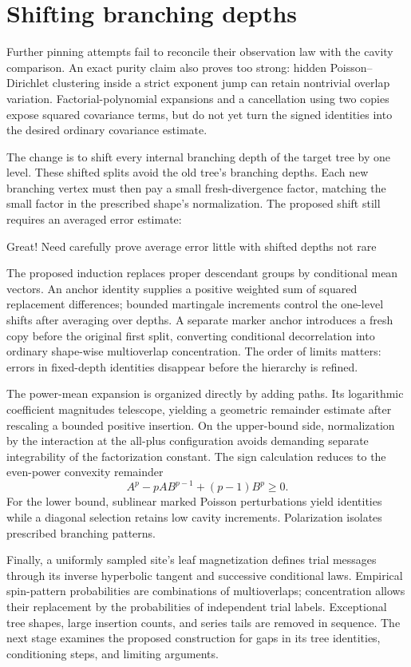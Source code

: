 \documentclass[11pt,letterpaper]{article}
\newcommand{\QuoteSource}[1]{\par\Needspace{4\baselineskip}\smallskip\noindent{\footnotesize\sffamily\color{accent}VERBATIM EXCERPT}\par\nobreak}
\begin{document}
\section{Shifting branching depths}
Further pinning attempts fail to reconcile their observation law with the cavity comparison. An exact purity claim also proves too strong: hidden Poisson--Dirichlet clustering inside a strict exponent jump can retain nontrivial overlap variation. Factorial-polynomial expansions and a cancellation using two copies expose squared covariance terms, but do not yet turn the signed identities into the desired ordinary covariance estimate.

The change is to shift every internal branching depth of the target tree by one level. These shifted splits avoid the old tree's branching depths. Each new branching vertex must then pay a small fresh-divergence factor, matching the small factor in the prescribed shape's normalization. The proposed shift still requires an averaged error estimate:
\QuoteSource{}
\begin{CoTQuote}
Great! Need carefully prove average error little with shifted depths not rare
\end{CoTQuote}
The proposed induction replaces proper descendant groups by conditional mean vectors. An anchor identity supplies a positive weighted sum of squared replacement differences; bounded martingale increments control the one-level shifts after averaging over depths. A separate marker anchor introduces a fresh copy before the original first split, converting conditional decorrelation into ordinary shape-wise multioverlap concentration. The order of limits matters: errors in fixed-depth identities disappear before the hierarchy is refined.

The power-mean expansion is organized directly by adding paths. Its logarithmic coefficient magnitudes telescope, yielding a geometric remainder estimate after rescaling a bounded positive insertion. On the upper-bound side, normalization by the interaction at the all-plus configuration avoids demanding separate integrability of the factorization constant. The sign calculation reduces to the even-power convexity remainder
\[
 A^p-pAB^{p-1}+(p-1)B^p\geq0.
\]
For the lower bound, sublinear marked Poisson perturbations yield identities while a diagonal selection retains low cavity increments. Polarization isolates prescribed branching patterns.

Finally, a uniformly sampled site's leaf magnetization defines trial messages through its inverse hyperbolic tangent and successive conditional laws. Empirical spin-pattern probabilities are combinations of multioverlaps; concentration allows their replacement by the probabilities of independent trial labels. Exceptional tree shapes, large insertion counts, and series tails are removed in sequence. The next stage examines the proposed construction for gaps in its tree identities, conditioning steps, and limiting arguments.
\end{document}
